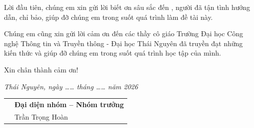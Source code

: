 
Lời đầu tiên, chúng em xin gửi lời biết ơn sâu sắc đến \instructorName, người đã tận tình hướng dẫn, chỉ bảo, giúp đỡ chúng em trong suốt quá trình làm đề tài này.

Chúng em cũng xin gửi lời cảm ơn đến các thầy cô giáo Trường Đại học Công nghệ Thông tin và Truyền thông - Đại học Thái Nguyên đã truyền đạt những kiến thức và giúp đỡ chúng em trong suốt quá trình học tập của mình.

Xin chân thành cảm ơn!

\vspace{6pt}
\begin{flushright}
\textit{Thái Nguyên, ngày …… tháng …… năm 2026}
\end{flushright}

\noindent
\begin{tabular}{@{}p{}>{\centering\arraybackslash}p{}@{}}
 & \textbf{Đại diện nhóm -- Nhóm trưởng} \\[2.2cm]
 & Trần Trọng Hoàn \\
\end{tabular}
